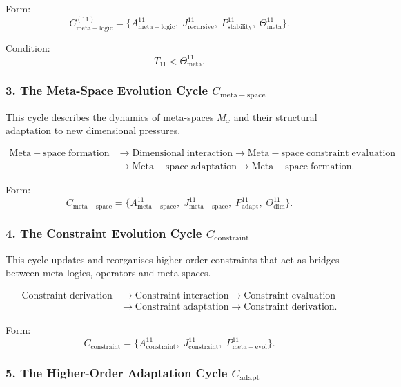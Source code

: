 Form:
\[
  C_{\mathrm{meta\!-\!logic}}^{(11)}
  =
  \{
    A^{11}_{\mathrm{meta\!-\!logic}},\;
    J^{11}_{\mathrm{recursive}},\;
    P^{11}_{\mathrm{stability}},\;
    \Theta^{11}_{\mathrm{meta}}
  \}.
\]

Condition:
\[
  T_{11}<\Theta^{11}_{\mathrm{meta}}.
\]


\subsubsection{3. The Meta-Space Evolution Cycle $C_{\mathrm{meta\!-\!space}}$}

This cycle describes the dynamics of meta-spaces $M_x$ and their structural
adaptation to new dimensional pressures.

\[
  \begin{aligned}
  \mathrm{Meta\!-\!space\;formation}
  &\to \mathrm{Dimensional\;interaction}
  \to \mathrm{Meta\!-\!space\;constraint\;evaluation}\\
  &\to \mathrm{Meta\!-\!space\;adaptation}
  \to \mathrm{Meta\!-\!space\;formation}.
  \end{aligned}
\]

Form:
\[
  C_{\mathrm{meta\!-\!space}}
  =
  \{
    A^{11}_{\mathrm{meta\!-\!space}},\;
    J^{11}_{\mathrm{meta\!-\!space}},\;
    P^{11}_{\mathrm{adapt}},\;
    \Theta^{11}_{\mathrm{dim}}
  \}.
\]


\subsubsection{4. The Constraint Evolution Cycle $C_{\mathrm{constraint}}$}

This cycle updates and reorganises higher-order constraints that act as
bridges between meta-logics, operators and meta-spaces.

\[
  \begin{aligned}
  \mathrm{Constraint\;derivation}
  &\to \mathrm{Constraint\;interaction}
  \to \mathrm{Constraint\;evaluation}\\
  &\to \mathrm{Constraint\;adaptation}
  \to \mathrm{Constraint\;derivation}.
  \end{aligned}
\]

Form:
\[
 C_{\mathrm{constraint}}
 =
 \{
   A^{11}_{\mathrm{constraint}},\;
   J^{11}_{\mathrm{constraint}},\;
   P^{11}_{\mathrm{meta\!-\!evol}}
 \}.
\]


\subsubsection{5. The Higher-Order Adaptation Cycle $C_{\mathrm{adapt}}$}

